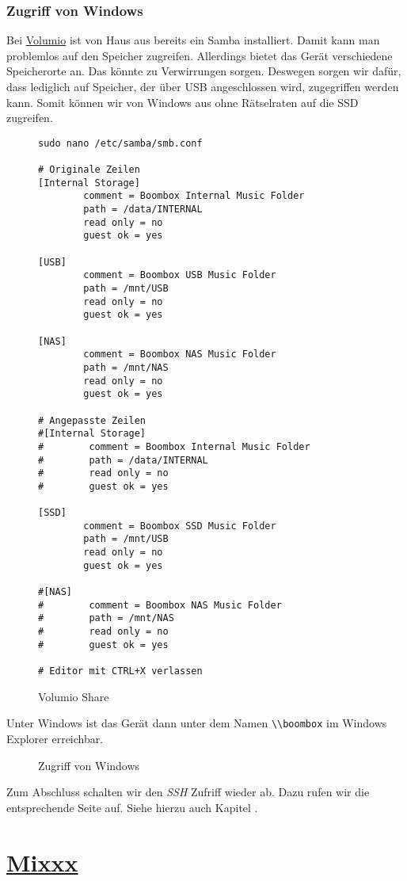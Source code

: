 \documentclass[12pt,a4paper]{article}
\newcommand{\capla}[1]{\caption{#1}\label{fig:#1}}
\newcommand{\code}[1]{\texttt{#1}}
\newcommand{\jpaimg}[2]{\begin{figure}[H]\centering\fbox{\texttt{[image: \#1]}}\capla{#2}\end{figure}}
\newcommand{\mixxx}{\href{https://www.mixxx.org/}{Mixxx}\index{Mixxx}}
\newcommand{\vol}{\href{https://volumio.org/}{Volumio}\index{Volumio}}
\begin{document}
\subsubsection{Zugriff von Windows}

Bei \vol{} ist von Haus aus bereits ein Samba installiert. Damit kann man
problemlos auf den Speicher zugreifen. Allerdings bietet das Gerät verschiedene
Speicherorte an. Das könnte zu Verwirrungen sorgen. Deswegen sorgen wir dafür,
dass lediglich auf Speicher, der über USB angeschlossen wird, zugegriffen werden
kann. Somit können wir von Windows aus ohne Rätselraten auf die SSD zugreifen.

\begin{figure}[H]
\begin{lstlisting}
sudo nano /etc/samba/smb.conf

# Originale Zeilen
[Internal Storage]
        comment = Boombox Internal Music Folder
        path = /data/INTERNAL
        read only = no
        guest ok = yes

[USB]
        comment = Boombox USB Music Folder
        path = /mnt/USB
        read only = no
        guest ok = yes

[NAS]
        comment = Boombox NAS Music Folder
        path = /mnt/NAS
        read only = no
        guest ok = yes

# Angepasste Zeilen
#[Internal Storage]
#        comment = Boombox Internal Music Folder
#        path = /data/INTERNAL
#        read only = no
#        guest ok = yes

[SSD]
        comment = Boombox SSD Music Folder
        path = /mnt/USB
        read only = no
        guest ok = yes

#[NAS]
#        comment = Boombox NAS Music Folder
#        path = /mnt/NAS
#        read only = no
#        guest ok = yes

# Editor mit CTRL+X verlassen
\end{lstlisting}
\capla{Volumio Share}
\end{figure}

Unter Windows ist das Gerät dann unter dem Namen
\code{\textbackslash{}\textbackslash{}boombox} im Windows Explorer erreichbar.

\jpaimg{./../images/win-bb.png}{Zugriff von Windows}

Zum Abschluss schalten wir den \textit{SSH} Zufriff wieder ab. Dazu rufen wir
die entsprechende Seite auf. Siehe hierzu auch Kapitel .

\section{\mixxx{}}
\end{document}

